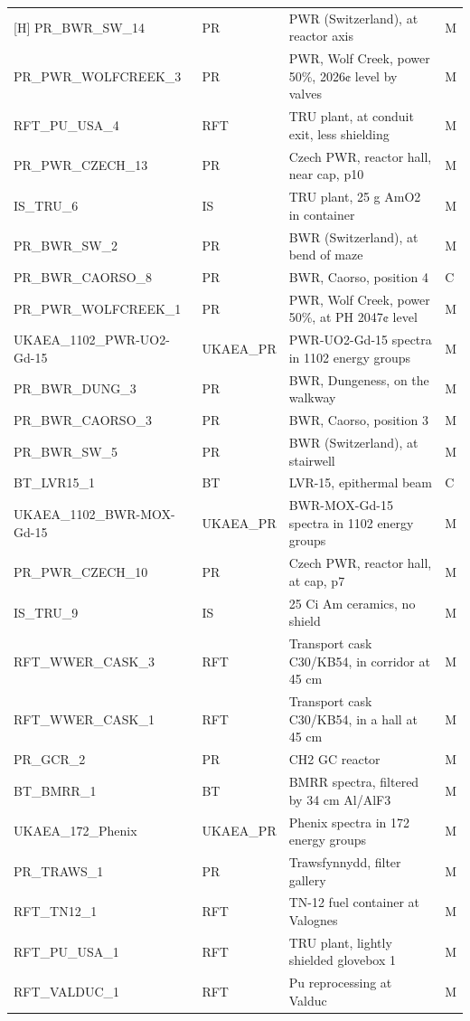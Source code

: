 \documentclass[a4paper, 12pt]{article}
\begin{document}
\begin{appendices}
\begin{longtable}{llll}[H]
PR\_BWR\_SW\_14 & PR & PWR (Switzerland), at reactor axis  & M\\
PR\_PWR\_WOLFCREEK\_3 & PR & PWR, Wolf Creek, power 50\%, 2026¢ level by valves  & M\\
RFT\_PU\_USA\_4 & RFT & TRU plant, at conduit exit, less shielding  & M\\
PR\_PWR\_CZECH\_13 & PR & Czech PWR, reactor hall, near cap, p10  & M\\
IS\_TRU\_6 & IS & TRU plant, 25 g AmO2 in container  & M\\
PR\_BWR\_SW\_2 & PR & BWR (Switzerland), at bend of maze  & M\\
PR\_BWR\_CAORSO\_8 & PR & BWR, Caorso, position 4  & C\\
PR\_PWR\_WOLFCREEK\_1 & PR & PWR, Wolf Creek, power 50\%, at PH 2047¢ level  & M\\
UKAEA\_1102\_PWR-UO2-Gd-15 & UKAEA\_PR & PWR-UO2-Gd-15 spectra in 1102 energy groups & M\\
PR\_BWR\_DUNG\_3 & PR & BWR, Dungeness, on the walkway  & M\\
PR\_BWR\_CAORSO\_3 & PR & BWR, Caorso, position 3  & M\\
PR\_BWR\_SW\_5 & PR & BWR (Switzerland), at stairwell  & M\\
BT\_LVR15\_1 & BT & LVR-15, epithermal beam  & C\\
UKAEA\_1102\_BWR-MOX-Gd-15 & UKAEA\_PR & BWR-MOX-Gd-15 spectra in 1102 energy groups & M\\
PR\_PWR\_CZECH\_10 & PR & Czech PWR, reactor hall, at cap, p7  & M\\
IS\_TRU\_9 & IS & 25 Ci Am ceramics, no shield  & M\\
RFT\_WWER\_CASK\_3 & RFT & Transport cask C30/KB54, in corridor at 45 cm  & M\\
RFT\_WWER\_CASK\_1 & RFT & Transport cask C30/KB54, in a hall at 45 cm  & M\\
PR\_GCR\_2 & PR & CH2 GC reactor  & M\\
BT\_BMRR\_1 & BT & BMRR spectra, filtered by 34 cm Al/AlF3  & M\\
UKAEA\_172\_Phenix & UKAEA\_PR & Phenix spectra in 172 energy groups & M\\
PR\_TRAWS\_1 & PR & Trawsfynnydd, filter gallery  & M\\
RFT\_TN12\_1 & RFT & TN-12 fuel container at Valognes  & M\\
RFT\_PU\_USA\_1 & RFT & TRU plant, lightly shielded glovebox 1  & M\\
RFT\_VALDUC\_1 & RFT & Pu reprocessing at Valduc  & M\\

\end{longtable}
\end{appendices}
\end{document}
